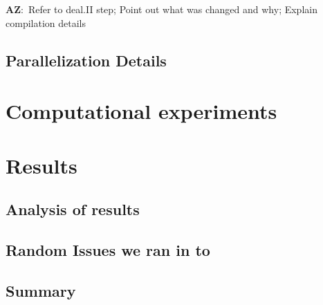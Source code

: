 \documentclass[12pt]{article}
\newcommand{\AZ}[1]{{\color{red}\textbf{AZ}:~#1}}
\begin{document}
\AZ{Refer to deal.II step; Point out what was changed and why; Explain compilation details}

\subsection{Parallelization Details}

\section{Computational experiments}

\section{Results}

\subsection{Analysis of results}

\subsection{Random Issues we ran in to}

\subsection{Summary}




\end{document}
